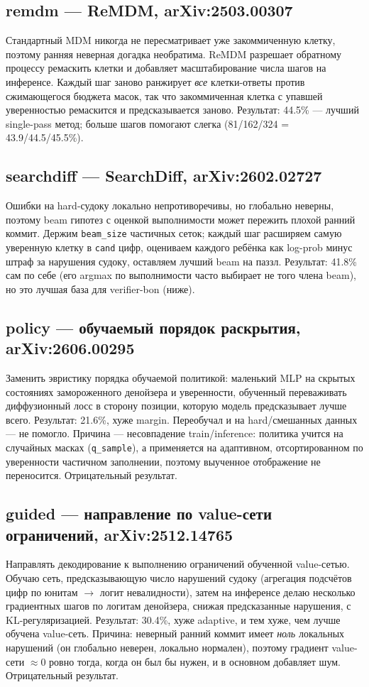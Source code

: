 \documentclass[11pt]{article}
\newcommand{\code}[1]{\texttt{#1}}
\begin{document}
\subsection{remdm — ReMDM, arXiv:2503.00307}
Стандартный MDM никогда не пересматривает уже закоммиченную клетку, поэтому ранняя неверная догадка
необратима. ReMDM разрешает обратному процессу ремаскить клетки и добавляет масштабирование числа шагов на
инференсе. Каждый шаг заново ранжирует \emph{все} клетки-ответы против сжимающегося бюджета масок, так что
закоммиченная клетка с упавшей уверенностью ремаскится и предсказывается заново. Результат: 44.5\% —
лучший single-pass метод; больше шагов помогают слегка (81/162/324 = 43.9/44.5/45.5\%).

\subsection{searchdiff — SearchDiff, arXiv:2602.02727}
Ошибки на hard-судоку локально непротиворечивы, но глобально неверны, поэтому beam гипотез с оценкой
выполнимости может пережить плохой ранний коммит. Держим \code{beam_size} частичных сеток; каждый шаг
расширяем самую уверенную клетку в \code{cand} цифр, оцениваем каждого ребёнка как log-prob минус штраф за
нарушения судоку, оставляем лучший beam на паззл. Результат: 41.8\% сам по себе (его argmax по выполнимости
часто выбирает не того члена beam), но это лучшая база для verifier-bon (ниже).

\subsection{policy — обучаемый порядок раскрытия, arXiv:2606.00295}
Заменить эвристику порядка обучаемой политикой: маленький MLP на скрытых состояниях замороженного денойзера
и уверенности, обученный переваживать диффузионный лосс в сторону позиции, которую модель предсказывает
лучше всего. Результат: 21.6\%, хуже margin. Переобучал и на hard/смешанных данных — не помогло. Причина —
несовпадение train/inference: политика учится на случайных масках (\code{q_sample}), а применяется на
адаптивном, отсортированном по уверенности частичном заполнении, поэтому выученное отображение не
переносится. Отрицательный результат.

\subsection{guided — направление по value-сети ограничений, arXiv:2512.14765}
Направлять декодирование к выполнению ограничений обученной value-сетью. Обучаю сеть, предсказывающую число
нарушений судоку (агрегация подсчётов цифр по юнитам $\to$ логит невалидности), затем на инференсе делаю
несколько градиентных шагов по логитам денойзера, снижая предсказанные нарушения, с KL-регуляризацией.
Результат: 30.4\%, хуже adaptive, и тем хуже, чем лучше обучена value-сеть. Причина: неверный ранний коммит
имеет \emph{ноль} локальных нарушений (он глобально неверен, локально нормален), поэтому градиент value-сети
$\approx$0 ровно тогда, когда он был бы нужен, и в основном добавляет шум. Отрицательный результат.
\end{document}

